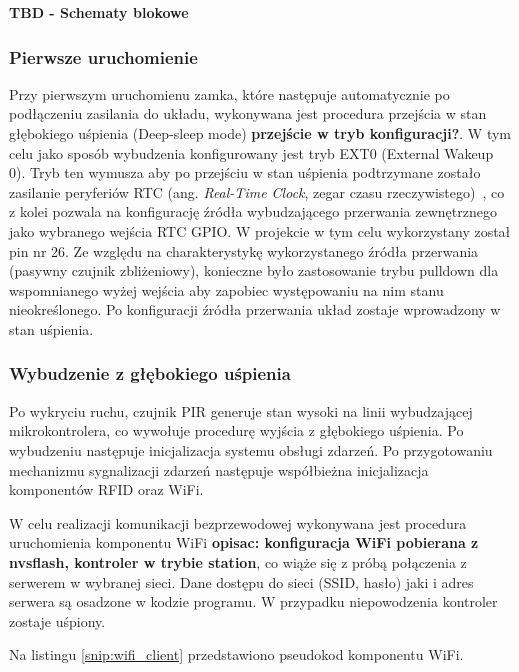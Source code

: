             \textbf{TBD - Schematy blokowe}

            \subsubsection{Pierwsze uruchomienie}

                Przy pierwszym uruchomienu zamka, które następuje automatycznie po podłączeniu zasilania do układu, wykonywana jest procedura przejścia w stan głębokiego uśpienia (Deep-sleep mode) \textbf{przejście w tryb konfiguracji?}. W tym celu jako sposób wybudzenia konfigurowany jest tryb EXT0 (External Wakeup 0). Tryb ten wymusza aby po przejściu w stan uśpienia podtrzymane zostało zasilanie peryferiów RTC (ang. \textit{Real-Time Clock}, zegar czasu rzeczywistego)~\cite{esp32-api-ref-deep-sleep}, co z kolei pozwala na konfigurację źródła wybudzającego przerwania zewnętrznego jako wybranego wejścia RTC GPIO. W projekcie w tym celu wykorzystany został pin nr 26. Ze względu na charakterystykę wykorzystanego źródła przerwania (pasywny czujnik zbliżeniowy), konieczne było zastosowanie trybu pulldown dla wspomnianego wyżej wejścia aby zapobiec występowaniu na nim stanu nieokreślonego. Po konfiguracji źródła przerwania układ zostaje wprowadzony w stan uśpienia.

            \subsubsection{Wybudzenie z głębokiego uśpienia}

                Po wykryciu ruchu, czujnik PIR generuje stan wysoki na linii wybudzającej mikrokontrolera, co wywołuje procedurę wyjścia z głębokiego uśpienia. Po wybudzeniu następuje inicjalizacja systemu obsługi zdarzeń. Po przygotowaniu mechanizmu sygnalizacji zdarzeń następuje współbieżna inicjalizacja komponentów RFID oraz WiFi.

                W celu realizacji komunikacji bezprzewodowej wykonywana jest procedura uruchomienia komponentu WiFi \textbf{opisac: konfiguracja WiFi pobierana z nvsflash, kontroler w trybie station}, co wiąże się z próbą połączenia z serwerem w wybranej sieci. Dane dostępu do sieci (SSID, hasło) jaki i adres serwera są osadzone w kodzie programu. W przypadku niepowodzenia kontroler zostaje uśpiony.

                Na listingu \ref{snip:wifi_client} przedstawiono pseudokod komponentu WiFi.

                

